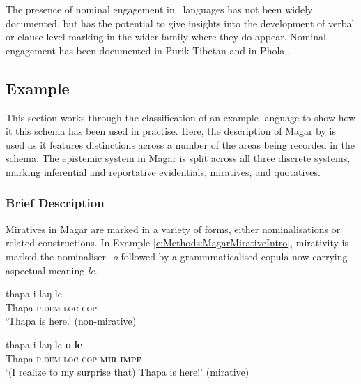 The presence of nominal engagement in \lfam\ languages has not been widely documented, but has the potential to give insights into the development of verbal or clause-level marking in the wider family where they do appear. Nominal engagement has been documented in Purik Tibetan \cite[Tibetic: India:][]{Zemp2021} and in Phola \cite[Ngwi-Burmese, PRC:][]{GonzalezPerez2023}.


\subsection{Example}\label{ss:Methods:MagarExample}
This section works through the classification of an example language to show how it this schema has been used in practise. Here, the description of Magar by  is used as it features distinctions across a number of the areas being recorded in the schema. The epistemic system in Magar is split across all three discrete systems, marking inferential and reportative evidentials, miratives, and quotatives.

\subsubsection{Brief Description}
Miratives in Magar are marked in a variety of forms, either nominalisations or related constructions. In Example \ref{e:Methods:MagarMirativeIntro}, mirativity is marked the nominaliser \textit{-o} followed by a grammmaticalised copula now carrying aspectual meaning \textit{le}. 

\begin{exe}
  \ex\label{e:Methods:MagarMirativeIntro}
  \begin{xlist}
    \ex
    \gll thapa i-laŋ le \\
    Thapa \textsc{p.dem-loc} \textsc{cop} \\
    \glt `Thapa is here.' (non-mirative)

    \ex 
    \gll thapa i-laŋ le-\textbf{o} \textbf{le} \\
    Thapa \textsc{p.dem-loc} \textsc{cop-\textbf{mir}} \textsc{\textbf{impf}} \\
    \glt `(I realize to my surprise that) Thapa is here!' (mirative)
  \end{xlist}
  \cite[Magar,][480]{GrunowHarsta2008}
\end{exe}

